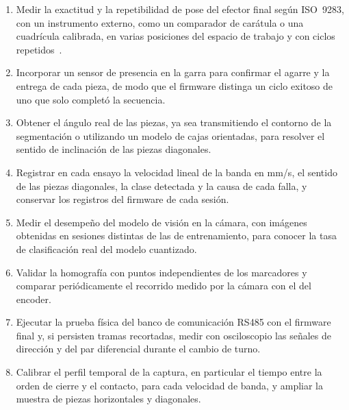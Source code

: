 \begin{enumerate}
	\item Medir la exactitud y la repetibilidad de pose del efector final según ISO~9283, con un instrumento externo, como un comparador de carátula o una cuadrícula calibrada, en varias posiciones del espacio de trabajo y con ciclos repetidos~\cite{iso9283}.

	\item Incorporar un sensor de presencia en la garra para confirmar el agarre y la entrega de cada pieza, de modo que el firmware distinga un ciclo exitoso de uno que solo completó la secuencia.

	\item Obtener el ángulo real de las piezas, ya sea transmitiendo el contorno de la segmentación o utilizando un modelo de cajas orientadas, para resolver el sentido de inclinación de las piezas diagonales.

	\item Registrar en cada ensayo la velocidad lineal de la banda en mm/s, el sentido de las piezas diagonales, la clase detectada y la causa de cada falla, y conservar los registros del firmware de cada sesión.

	\item Medir el desempeño del modelo de visión en la cámara, con imágenes obtenidas en sesiones distintas de las de entrenamiento, para conocer la tasa de clasificación real del modelo cuantizado.

	\item Validar la homografía con puntos independientes de los marcadores y comparar periódicamente el recorrido medido por la cámara con el del encoder.

	\item Ejecutar la prueba física del banco de comunicación RS485 con el firmware final y, si persisten tramas recortadas, medir con osciloscopio las señales de dirección y del par diferencial durante el cambio de turno.

	\item Calibrar el perfil temporal de la captura, en particular el tiempo entre la orden de cierre y el contacto, para cada velocidad de banda, y ampliar la muestra de piezas horizontales y diagonales.
\end{enumerate}

